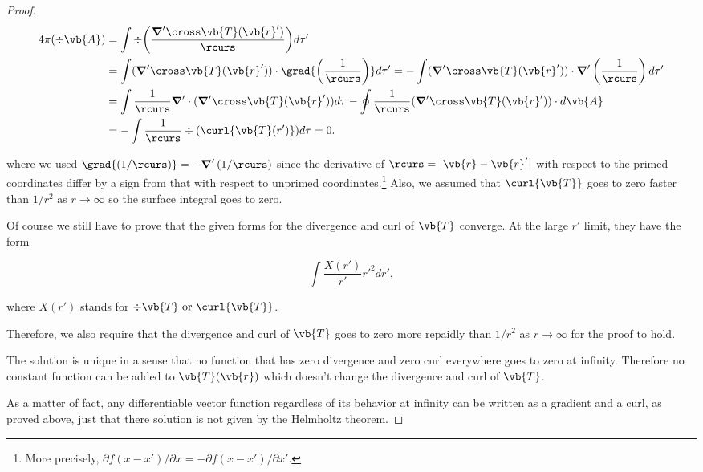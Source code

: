 \documentclass[english,a4paper,12pt]{report}
\begin{document}
\begin{proof}
\begin{equation}
	\begin{aligned}
		4\pi (\div{\vb{A} } ) &= \int \div{\left(\frac{\boldsymbol{\nabla}' \cross \vb{T} (\vb{r} ')}{\rcurs }\right)} d\tau ' \\ 
		&= \int (\boldsymbol{\nabla}' \cross \vb{T} (\vb{r} ')) \cdot \grad{\left(\frac{1}{\rcurs } \right)} d\tau ' = -\int (\boldsymbol{\nabla}' \cross \vb{T} (\vb{r} ')) \cdot \boldsymbol{\nabla}'\left(\frac{1}{\rcurs } \right) d\tau ' \\
		&= \int \frac{1}{\rcurs }\boldsymbol{\nabla}' \cdot (\boldsymbol{\nabla}' \cross \vb{T} (\vb{r} ')) d\tau  - \oint \frac{1}{\rcurs } (\boldsymbol{\nabla}' \cross \vb{T} (\vb{r} ')) \cdot d\vb{A}  \\
        &= - \int \frac{1}{\rcurs } \div{(\curl{\vb{T} (r')} )} d\tau = 0.  	
	\end{aligned}
\end{equation}

where we used \( \grad{\left(1 /\rcurs \right)} = - \boldsymbol{\nabla}'\left(1/\rcurs  \right) \) since the derivative of \(\rcurs = \left| \vb{r} - \vb{r} ' \right| \) with respect to the primed coordinates differ by a sign from that with respect to unprimed coordinates.\footnote{More precisely, \(\partial f(x-x')/\partial x  = - \partial f(x-x')/\partial x' \).} Also, we assumed that \(\curl{\vb{T} } \) goes to zero faster than \(1 /r^2 \) as \(r \to  \infty\) so the surface integral goes to zero.    

Of course we still have to prove that the given forms for the divergence and curl of \(\vb{T} \) converge. At the large \(r'\) limit, they have the form

\begin{equation}
	\int \frac{X(r')}{r'}r'^2 dr', 
\end{equation}

where \(X(r')\) stands for \(\div{\vb{T} } \text { or } \curl{\vb{T} }\).   

Therefore, we also require that the divergence and curl of \(\vb{T} \) goes to zero more repaidly than \(1 /r^2 \) as \(r \to  \infty\) for the proof to hold. 

The solution is unique in a sense that no function that has zero divergence and zero curl everywhere goes to zero at infinity. Therefore no constant function can be added to \(\vb{T} (\vb{r} )\) which doesn't change the divergence and curl of \(\vb{T} \). 

As a matter of fact, any differentiable vector function regardless of its behavior at infinity can be written as a gradient and a curl, as proved above, just that there solution is not given by the Helmholtz theorem.

\end{proof}
\end{document}
